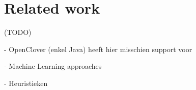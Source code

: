\chapter{Related work}

(TODO)

- OpenClover (enkel Java) heeft hier misschien support voor

- Machine Learning approaches

- Heuristieken